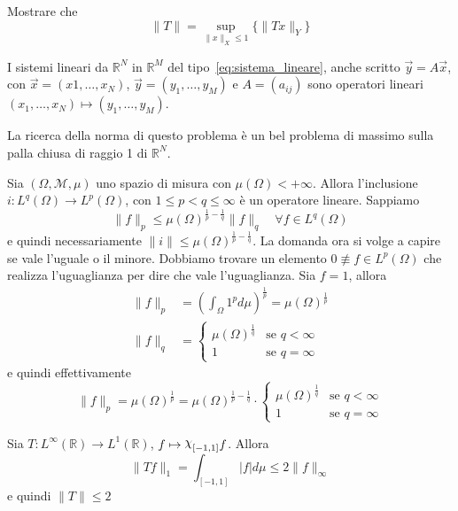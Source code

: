 \begin{eser}
    Mostrare che
    \[
        \|T\| = \sup_{\|x\|_X \le 1}  \{\|Tx\|_Y \} 
    \]
\end{eser}
\begin{example}
    I sistemi lineari da \(\mathbb{R}^{N}\) in \(\mathbb{R}^{M}\) del
    tipo~\eqref{eq:sistema_lineare}, 
    anche scritto \(\vec{y} = A \vec{x}\), con \(\vec{x} = {(x1, \dots, x_N)}\),
    \(\vec{y} = {(y_{1}, \dots, y_M)}\) e \(A = {(a_{ij})}\) 
    sono operatori lineari \({(x_{1}, \dots, x_N) \mapsto {(y_{1}, \dots,
    y_M)}}\).

    La ricerca della norma di questo problema è un bel problema di massimo sulla
    palla chiusa di raggio 1 di \(\mathbb{R}^{N}\).
\end{example}
\begin{example}
    Sia \({(\Omega, \mathcal{M}, \mu)}\) uno spazio di misura con
    \(\mu{(\Omega)} < +\infty\). Allora l'inclusione \(i : L^{q}{(\Omega)} \to
    L^{p}{(\Omega)}\), con \(1 \le p < q \le \infty\) è un operatore lineare.
    Sappiamo
    \[
        \|f\|_p \le {\mu{(\Omega)}}^{\frac{1}{p} - \frac{1}{q}}\|f\|_q \quad \forall
        f \in L^{q}{(\Omega)}
    \]
    e quindi necessariamente \(\|i\| \le \mu{(\Omega)}^{\frac{1}{p} -
    \frac{1}{q}}\). La domanda ora si volge a capire se vale l'uguale o il
    minore. Dobbiamo trovare un elemento \(0 \not\equiv f \in L^{p}{(\Omega)}\)
    che realizza l'uguaglianza per dire che vale l'uguaglianza.
    Sia \(f = 1\), allora
    \begin{align*}
        \|f\|_p &= {\left( \int_\Omega 1^{p}d\mu \right)} ^{\frac{1}{p}} =
        \mu{(\Omega)}^{\frac{1}{p}} \\
        \|f\|_q &= \begin{cases}
            \mu{(\Omega)}^{\frac{1}{q}} & \text{se } q <
            \infty \\
            1 & \text{se } q = \infty
        \end{cases}
    \end{align*}
    e quindi effettivamente
    \[
        \|f\|_p = \mu{(\Omega)}^{\frac{1}{p}} = \mu{(\Omega)}^{\frac{1}{p} -
        \frac{1}{q}} \cdot \begin{cases}
                \mu{(\Omega)}^{\frac{1}{q}} & \text{se } q < \infty \\
                1 & \text{se } q = \infty
            \end{cases}
    \]
\end{example}
\begin{example}\label{ex:int_continuo}
    Sia \(T : L^{\infty}{(\mathbb{R})} \to L^{1}{(\mathbb{R})}\), \(f \mapsto
    \rchi_{[-1, 1]}f \). Allora
    \[
        \|Tf\|_1 = \int_{[-1, 1]}  |f| d\mu \le 2 \|f\|_{\infty} 
    \]
    e quindi \(\|T\| \le 2\) 
\end{example}
